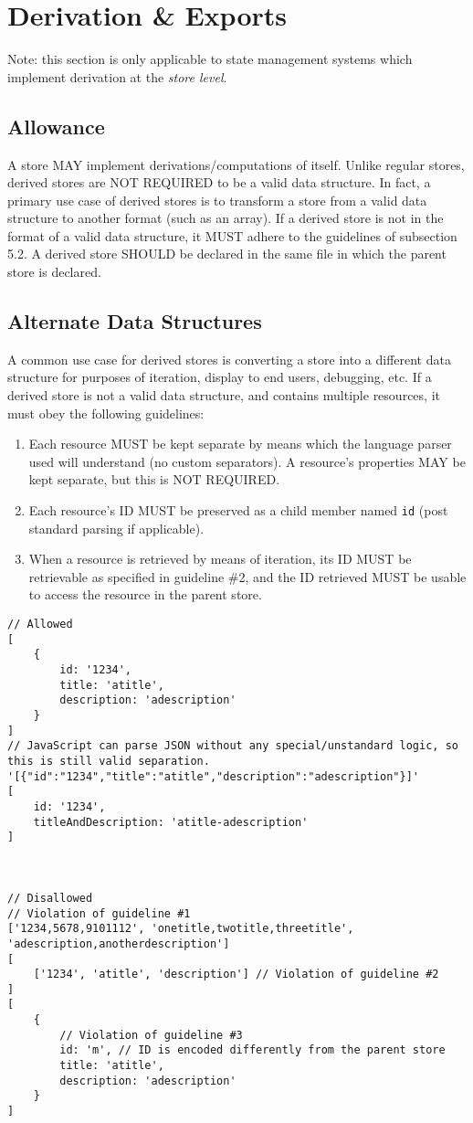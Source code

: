 \documentclass{article}
\begin{document}
\section{Derivation \& Exports}
Note: this section is only applicable to state management systems which implement derivation at the \emph{store level}.

\subsection{Allowance}
A store MAY implement derivations/computations of itself. Unlike regular stores, derived stores are NOT REQUIRED to be a valid data structure. In fact, a primary use case of derived stores is to transform a store from a valid data structure to another format (such as an array). If a derived store is not in the format of a valid data structure, it MUST adhere to the guidelines of subsection 5.2. A derived store SHOULD be declared in the same file in which the parent store is declared.

\subsection{Alternate Data Structures}
A common use case for derived stores is converting a store into a different data structure for purposes of iteration, display to end users, debugging, etc. If a derived store is not a valid data structure, and contains multiple resources, it must obey the following guidelines:
\begin{enumerate}
    \item Each resource MUST be kept separate by means which the language parser used will understand (no custom separators). A resource's properties MAY be kept separate, but this is NOT REQUIRED.
    \item Each resource's ID MUST be preserved as a child member named \verb|id| (post standard parsing if applicable).
    \item When a resource is retrieved by means of iteration, its ID MUST be retrievable as specified in guideline \#2, and the ID retrieved MUST be usable to access the resource in the parent store.
\end{enumerate}

\begin{lstlisting}[caption=Derived Store as Array]
// Allowed
[
    {
        id: '1234',
        title: 'atitle',
        description: 'adescription'
    }
]
// JavaScript can parse JSON without any special/unstandard logic, so this is still valid separation.
'[{"id":"1234","title":"atitle","description":"adescription"}]'
[
    id: '1234',
    titleAndDescription: 'atitle-adescription'
]



// Disallowed
// Violation of guideline #1
['1234,5678,9101112', 'onetitle,twotitle,threetitle', 'adescription,anotherdescription']
[
    ['1234', 'atitle', 'description'] // Violation of guideline #2
]
[
    {
        // Violation of guideline #3
        id: 'm', // ID is encoded differently from the parent store
        title: 'atitle',
        description: 'adescription'
    }
]
\end{lstlisting}
\end{document}
